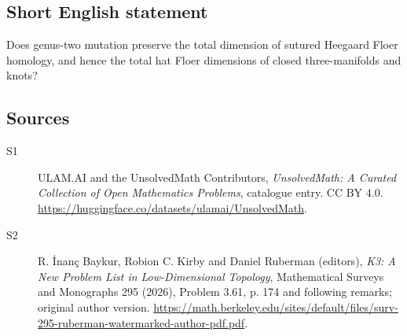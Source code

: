 \documentclass[11pt]{article}
\begin{document}
\subsection{Short English statement}
Does genus-two mutation preserve the total dimension of sutured Heegaard Floer homology, and hence the total hat Floer dimensions of closed three-manifolds and knots?
\subsection{Sources}
\begin{description}
\item[\hypertarget{source:statement:1}{S1}] ULAM.AI and the UnsolvedMath Contributors, \emph{UnsolvedMath: A Curated Collection of Open Mathematics Problems}, catalogue entry. CC BY 4.0. \url{https://huggingface.co/datasets/ulamai/UnsolvedMath}.
\item[\hypertarget{source:statement:2}{S2}] R. İnanç Baykur, Robion C. Kirby and Daniel Ruberman (editors), \emph{K3: A New Problem List in Low-Dimensional Topology}, Mathematical Surveys and Monographs 295 (2026), Problem 3.61, p. 174 and following remarks; original author version. \url{https://math.berkeley.edu/sites/default/files/surv-295-ruberman-watermarked-author-pdf.pdf}.
\end{description}
\label{end:statement}
\end{document}
